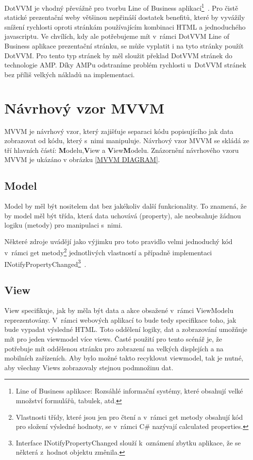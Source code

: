 DotVVM je vhodný převážně pro tvorbu Line of Business aplikací\footnote{Line of Business aplikace: Rozsáhlé informační systémy, které obsahují velké množství formulářů, tabulek, atd.}~\cite{DotVVMIntro}. Pro čistě statické prezentační weby většinou nepřináší dostatek benefitů, které by vyvážily snížení rychlosti oproti stránkám používajícím kombinaci HTML a jednoduchého javascriptu. Ve chvílích, kdy ale potřebujeme mít v~rámci DotVVM Line of Business aplikace prezentační stránku, se může vyplatit i na tyto stránky použít DotVVM. Pro tento typ stránek by měl sloužit překlad DotVVM stránek do technologie AMP. Díky AMPu odstraníme problém rychlosti u~DotVVM stránek bez příliš velkých nákladů na implementaci.

\section{Návrhový vzor MVVM}
MVVM je návrhový vzor, který zajišťuje separaci kódu popisujícího jak data zobrazovat od kódu, který s~nimi manipuluje. Návrhový vzor MVVM se skládá ze tří hlavních částí: \textbf{M}odelu,\textbf{V}iew a \textbf{V}iew\textbf{M}odelu. Znázornění návrhového vzoru MVVM je ukázáno v obrázku \ref{MVVM DIAGRAM}.

\subsection*{Model}
Model by měl být nositelem dat bez jakékoliv další funkcionality. To znamená, že by model měl být třída, která data uchovává (property), ale neobsahuje žádnou logiku (metody) pro manipulaci s~nimi.

Některé zdroje uvádějí jako výjimku pro toto pravidlo velmi jednoduchý kód v~rámci get metody\footnote{Vlastnosti třídy, které jsou jen pro čtení a v~rámci get metody obsahují kód pro složení výsledné hodnoty, se v~rámci C# nazývají calculated properties.} jednotlivých vlastností a případně implementaci INotifyPropertyChanged\footnote{Interface INotifyPropertyChanged slouží k~oznámení zbytku aplikace, že se některá z~hodnot objektu změnila.}~\cite{microsoft_2014}.

\subsection*{View}
View specifikuje, jak by měla být data a akce obsažené v~rámci ViewModelu reprezentovány. V~rámci webových aplikací to bude tedy specifikace toho, jak bude vypadat výsledné HTML. Toto oddělení logiky, dat a zobrazování umožňuje mít pro jeden viewmodel více views. Časté použití pro tento scénář je, že potřebuje mít oddělenou stránku pro zobrazení na velkých displejích a na mobilních zařízeních. Aby bylo možné takto recyklovat viewmodel, tak je nutné, aby všechny Views zobrazovaly stejnou podmnožinu dat.
